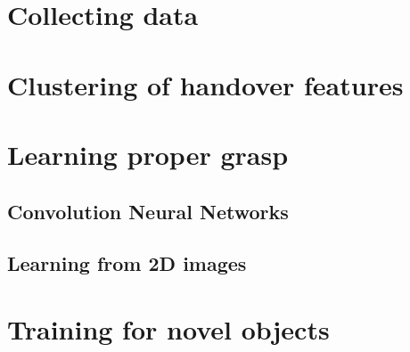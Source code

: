 \section{Collecting data}


\section{Clustering of handover features}


\section{Learning proper grasp}

\subsection{Convolution Neural Networks}

\subsection{Learning from 2D images}


\section{Training for novel objects}
